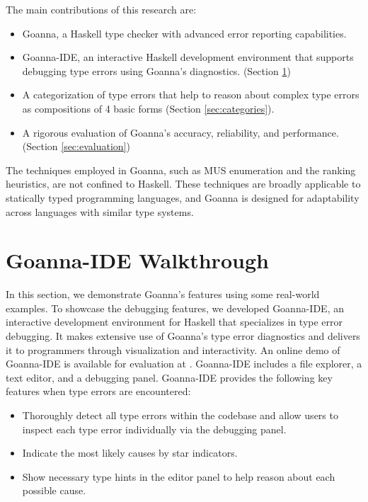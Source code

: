 \documentclass[pdflatex,lineno,sn-nature,Numbered]{sn-jnl}%
\begin{document}
The main contributions of this research are:
\begin{itemize}
    \item Goanna, a Haskell type checker with advanced error reporting capabilities.
    \item Goanna-IDE, an interactive Haskell development environment that supports debugging type errors using Goanna's diagnostics. (Section \ref{sec:walkthrough})
    \item A categorization of type errors that help to reason about complex type errors as compositions of 4 basic forms (Section \ref{sec:categories}).
    \item A rigorous evaluation of Goanna's accuracy, reliability, and performance. (Section \ref{sec:evaluation})
\end{itemize}

The techniques employed in Goanna, such as MUS enumeration and the ranking heuristics, are not confined to Haskell. These techniques are broadly applicable to statically typed programming languages, and Goanna is designed for adaptability across languages with similar type systems.

\section{Goanna-IDE Walkthrough} \label{sec:walkthrough}
In this section, we demonstrate Goanna's features using some real-world examples. To showcase the debugging features,  we developed Goanna-IDE, an interactive development environment for Haskell that specializes in type error debugging. It makes extensive use of Goanna's type error diagnostics and delivers it to programmers through visualization and interactivity. An online demo of Goanna-IDE is available for evaluation at \cite{Fu2023-bo}. Goanna-IDE includes a file explorer, a text editor, and a debugging panel. Goanna-IDE provides the following key features when type errors are encountered:

    \begin{itemize}
        \item Thoroughly detect all type errors within the codebase and allow users to inspect each type error individually via the debugging panel.
        \item Indicate the most likely causes by star indicators.
        \item Show necessary type hints in the editor panel to help reason about each possible cause.
    \end{itemize}
\end{document}
